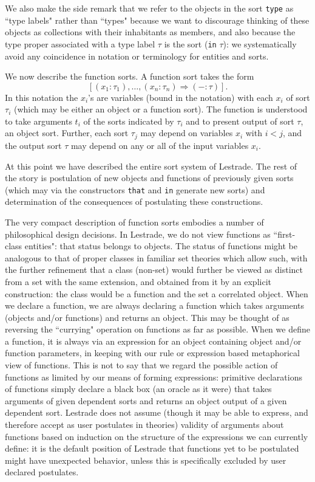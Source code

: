 \documentclass{article}
\begin{document}
We also make the side remark that we refer to the objects in the sort {\tt type} as ``type labels" rather than ``types" because we want to discourage thinking of these objects as collections with their inhabitants as members, and also because the type proper associated with a type label $\tau$  is the sort ({\tt in} $\tau$):  we systematically avoid any coincidence in notation or terminology for entities and sorts.

We now describe the function sorts.  A function sort takes the form $$[(x_1:\tau_1),\ldots,(x_n:\tau_n) \Rightarrow (-:\tau)].$$  In this notation
the $x_i$'s are variables (bound in the notation) with each $x_i$ of sort $\tau_i$ (which may be either an object or a function sort).  The function is understood to take arguments $t_i$ of the sorts indicated by $\tau_i$ and to present output of sort $\tau$, an object sort.  Further, each sort $\tau_j$ may depend
on variables $x_i$ with $i<j$, and the output sort $\tau$ may depend on any or all of the input variables $x_i$.

At this point we have described the entire sort system of Lestrade.  The rest of the story is postulation of new objects and functions of previously given sorts (which may via the constructors {\tt that} and {\tt in} generate new sorts) and determination of the consequences of postulating these constructions.

The very compact description of function sorts embodies a number of philosophical design decisions.  In Lestrade, we do not view functions as
``first-class entities":  that status belongs to objects.  The status of functions might be analogous to that of proper classes in familiar set theories which allow such, with the further refinement that a class (non-set) would further be viewed as distinct from a set with the same extension, and obtained from it by an explicit construction:  the class would be a function and the set a correlated object.   When we declare a function, we are always declaring a function which takes arguments (objects and/or functions) and returns an object.  This may be thought of as reversing the ``currying" operation on functions as far as possible.  When we define a function, it is always via
an expression for an object containing object and/or function parameters, in keeping with our rule or expression based metaphorical view of functions.  This is not to say that we regard the possible action of functions as limited by our means of forming expressions:  primitive declarations of functions simply declare a black box (an oracle as it were) that takes arguments of given dependent sorts and returns an object output of a given dependent sort.  Lestrade does not assume (though it may be able to express, and therefore accept as user postulates in theories) validity of arguments about functions based on induction on the structure of the expressions we can currently define:  it is the default position of Lestrade that functions yet to be postulated might have unexpected behavior, unless this is specifically excluded by user declared postulates.
\end{document}
